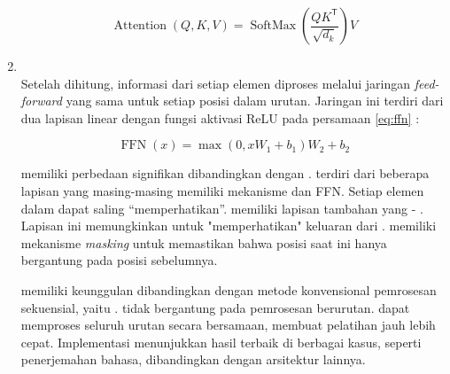 \begin{enumerate}
	      \begin{equation}
		      \label{eq:attention-softmax}
		      \operatorname{Attention}(Q, K, V) = \operatorname{SoftMax}\left(\frac{QK^\mathsf{T}}{\sqrt{d_k}}\right)V
	      \end{equation}

	\item \ffnfull~\\
	      Setelah \attention{} dihitung, informasi dari setiap elemen diproses melalui jaringan \emph{feed-forward} yang sama untuk setiap posisi dalam urutan. Jaringan ini terdiri dari dua lapisan linear dengan fungsi aktivasi ReLU pada persamaan \eqref{eq:ffn} \parencite{vaswani2017attention}:

	      \begin{equation}
		      \label{eq:ffn}
		      \operatorname{FFN}(x) = \max(0, xW_1 + b_1)W_2 + b_2
	      \end{equation}

	      \decoderfl{} memiliki perbedaan signifikan dibandingkan dengan \encoder.
	      \encoderfl{} terdiri dari beberapa lapisan yang masing-masing memiliki mekanisme \selfattention{} dan FFN. Setiap elemen dalam \sequence{} dapat saling “memperhatikan”. \decoderfl{} memiliki lapisan tambahan yang \encoder{}\--\decoder{} \attention. Lapisan ini memungkinkan \decoder{} untuk "memperhatikan" keluaran dari \encoder. \decoderfl{} memiliki mekanisme \emph{masking} untuk memastikan bahwa posisi saat ini hanya bergantung pada posisi sebelumnya.

	      \pagebreak

	      \transformer{} memiliki keunggulan dibandingkan dengan metode konvensional pemrosesan sekuensial, yaitu \rnn. \transformer{} tidak bergantung
	      pada pemrosesan berurutan. \transformer{} dapat memproses seluruh urutan secara bersamaan, membuat pelatihan jauh lebih cepat. Implementasi \transformer{} menunjukkan hasil terbaik di berbagai kasus, seperti penerjemahan bahasa,
	      dibandingkan dengan arsitektur lainnya.

\end{enumerate}
